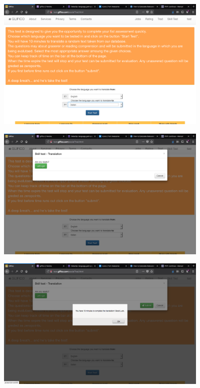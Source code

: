 \documentclass[11 pt, a4paper]{article}
\begin{document}
\begin{figure}[H]
\centering
\includegraphics[width=0.9\textwidth]{translator_socialtrad3.png}
\end{figure}


\clearpage
\begin{figure}[H]
\centering
\includegraphics[width=0.9\textwidth]{translator_socialtrad4.png}
\end{figure}


\begin{figure}[H]
\centering
\includegraphics[width=0.9\textwidth]{translator_socialtrad5.png}
\end{figure}
\end{document}
